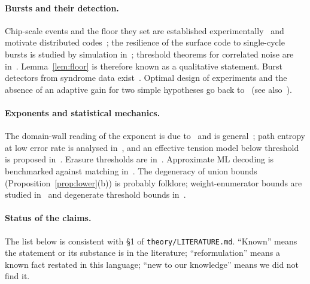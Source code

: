 \paragraph{Bursts and their detection.}
Chip-scale events and the floor they set are established experimentally~\cite{McEwen,Google22,Google24} and motivate distributed codes~\cite{XuChip}; the resilience of the surface code to single-cycle bursts is studied by simulation in~\cite{TPMP}; threshold theorems for correlated noise are in~\cite{TerhalBurkard,AKP}. Lemma~\ref{lem:floor} is therefore known as a qualitative statement. Burst detectors from syndrome data exist~\cite{Q3DE,Vallero}. Optimal design of experiments and the absence of an adaptive gain for two simple hypotheses go back to~\cite{Chernoff59,Hayashi09} (see also~\cite{NAV}).

\paragraph{Exponents and statistical mechanics.}
The domain-wall reading of the exponent is due to~\cite{DKLP} and is general~\cite{CF}; path entropy at low error rate is analysed in~\cite{WatsonBarrett,BBKM}, and an effective tension model below threshold is proposed in~\cite{English}. Erasure thresholds are in~\cite{SBD,Colmenarez}. Approximate ML decoding is benchmarked against matching in~\cite{BSV}. The degeneracy of union bounds (Proposition~\ref{prop:lower}(b)) is probably folklore; weight-enumerator bounds are studied in~\cite{FVC} and degenerate threshold bounds in~\cite{KPDP,DKP}.

\paragraph{Status of the claims.}
The list below is consistent with \S1 of \texttt{theory/LITERATURE.md}. ``Known'' means the statement or its substance is in the literature; ``reformulation'' means a known fact restated in this language; ``new to our knowledge'' means we did not find it.

